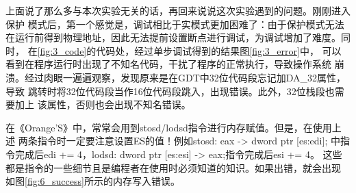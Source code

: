 \documentclass[12pt,a4paper,UTF8]{ctexart}
\begin{document}
上面说了那么多与本次实验无关的话，再回来说说这次实验遇到的问题。刚刚进入保护
模式后，第一个感觉是，调试相比于实模式更加困难了：由于保护模式无法
在运行前得到物理地址，因此无法提前设置断点进行调试，为调试增加了难度。同时，
在\ref{fig:3_code}的代码处，经过单步调试得到的结果图\ref{fig:3_error}中，
可以看到在程序运行时出现了不知名代码，干扰了程序的正常执行，导致操作系统
崩溃。经过肉眼一遍遍观察，发现原来是在GDT中32位代码段忘记加DA\_32属性，导致
跳转时将32位代码段当作16位代码段跳入，出现错误。此外，32位栈段也需要加上
该属性，否则也会出现不知名错误。

\begin{figure}[htbp]
\centering
{}
\end{figure}

在《Orange'S》中，常常会用到stosd/lodsd指令进行内存赋值。但是，在使用上述
两条指令时一定要注意设置ES的值！例如stosd: eax -> dword  ptr [es:edi];
中指令完成后edi += 4，lodsd: dword ptr [es:esi] -> eax;指令完成后esi += 4。
这些都是指令的一些细节且是编程者在使用时必须知道的知识。如果出错，就会出现
如图\ref{fig:6_success}所示的内存写入错误。
\end{document}
